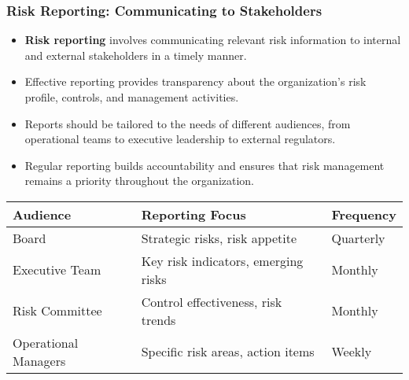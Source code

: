 \documentclass{beamer}
\begin{document}
            \begin{frame}
            \frametitle{Risk Reporting: Communicating to Stakeholders}
            \begin{itemize}
              \item \textbf{Risk reporting} involves communicating relevant risk information to internal and external stakeholders in a timely manner.
              \item Effective reporting provides transparency about the organization's risk profile, controls, and management activities.
              \item Reports should be tailored to the needs of different audiences, from operational teams to executive leadership to external regulators.
              \item Regular reporting builds accountability and ensures that risk management remains a priority throughout the organization.
            \end{itemize}
            
            \begin{table}
            \centering
            \begin{tabular}{lll}
            \toprule
            \textbf{Audience} & \textbf{Reporting Focus} & \textbf{Frequency} \\
            \midrule
            Board & Strategic risks, risk appetite & Quarterly \\
            Executive Team & Key risk indicators, emerging risks & Monthly \\
            Risk Committee & Control effectiveness, risk trends & Monthly \\
            Operational Managers & Specific risk areas, action items & Weekly \\
            \bottomrule
            \end{tabular}
            \end{table}
            \end{frame}
            
\end{document}
